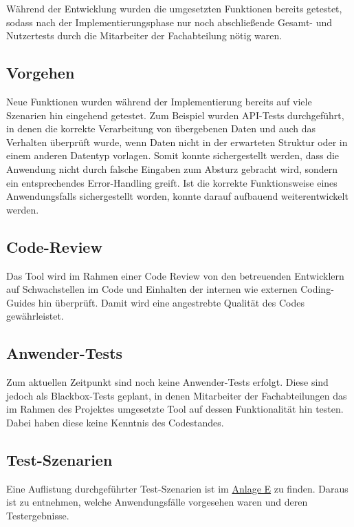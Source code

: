 Während der Entwicklung wurden die umgesetzten Funktionen bereits getestet, sodass nach der Implementierungsphase nur noch abschließende Gesamt- und Nutzertests durch die Mitarbeiter der Fachabteilung nötig waren.

\subsection{Vorgehen}
    Neue Funktionen wurden während der Implementierung bereits auf viele Szenarien hin eingehend getestet. Zum Beispiel wurden API-Tests durchgeführt, in denen die korrekte Verarbeitung von übergebenen Daten und auch das Verhalten überprüft wurde, wenn Daten nicht in der erwarteten Struktur oder in einem anderen Datentyp vorlagen. Somit konnte sichergestellt werden, dass die Anwendung nicht durch falsche Eingaben zum Absturz gebracht wird, sondern ein entsprechendes Error-Handling greift. Ist die korrekte Funktionsweise eines Anwendungsfalls sichergestellt worden, konnte darauf aufbauend weiterentwickelt werden.

\subsection{Code-Review}
    Das Tool wird im Rahmen einer Code Review von den betreuenden Entwicklern auf Schwachstellen im Code und Einhalten der internen wie externen Coding-Guides hin überprüft. Damit wird eine angestrebte Qualität des Codes gewährleistet.

\subsection{Anwender-Tests}
    Zum aktuellen Zeitpunkt sind noch keine Anwender-Tests erfolgt. Diese sind jedoch als Blackbox-Tests geplant, in denen Mitarbeiter der Fachabteilungen das im Rahmen des Projektes umgesetzte Tool auf dessen Funktionalität hin testen. Dabei haben diese keine Kenntnis des Codestandes.

\subsection{Test-Szenarien}
    Eine Auflistung durchgeführter Test-Szenarien ist im \hyperref[anlage:test]{Anlage E} zu finden. Daraus ist zu entnehmen, welche Anwendungsfälle vorgesehen waren und deren Testergebnisse.